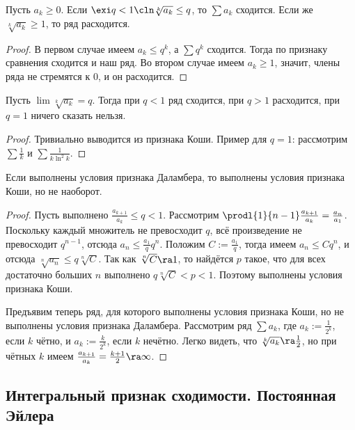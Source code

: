 \documentclass[a4paper]{article}
\begin{document}
\begin{theorem}
Пусть $a_k \ge 0$. Если $\exi q < 1\cln \sqrt[k]{a_k} \le q$, то $\sum a_k$ сходится.
Если же $\sqrt[k]{a_k} \ge 1$, то ряд расходится.
\end{theorem}
\begin{proof}
В первом случае имеем $a_k \le q^k$, а $\sum q^k$ сходится. Тогда по признаку сравнения сходится и наш ряд. Во
втором случае имеем $a_k \ge 1$, значит, члены ряда не стремятся к 0, и он расходится.
\end{proof}

\begin{theorem}
Пусть $\lim \sqrt[k]{a_k} = q$. Тогда при $q < 1$ ряд сходится, при $q > 1$ расходится, при $q=1$ ничего сказать нельзя.
\end{theorem}
\begin{proof}
Тривиально выводится из признака Коши. Пример для $q=1$: рассмотрим $\sum\frac{1}{k}$ и $\sum\frac{1}{k\ln^2 k}$.
\end{proof}

\begin{theorem}
Если выполнены условия признака Даламбера, то выполнены условия признака Коши, но не наоборот.
\end{theorem}
\begin{proof}
Пусть выполнено $\frac{a_{k+1}}{a_k} \le q < 1$.
Рассмотрим $\prodl{1}{n-1} \frac{a_{k+1}}{a_k} = \frac{a_n}{a_1}$. Поскольку каждый множитель не превосходит $q$, всё произведение не превосходит
$q^{n-1}$, отсюда $a_n \le \frac{a_1}{q}q^n$. Положим $C:=\frac{a_1}{q}$, тогда имеем $a_n \le Cq^n$, и
отсюда $\sqrt[n]{a_n} \le q \sqrt[n]{C}$. Так как $\sqrt[n]{C}\ra 1$, то найдётся $p$ такое, что для всех достаточно больших
$n$ выполнено $q \sqrt[n]{C} < p < 1$. Поэтому выполнены условия признака Коши.

Предъявим теперь ряд, для которого выполнены условия признака Коши, но не выполнены условия признака Даламбера. Рассмотрим ряд $\sum a_k$, где
$a_k:=\frac{1}{2^k}$, если $k$ чётно, и $a_k := \frac{k}{2^k}$, если $k$ нечётно. Легко видеть, что $\sqrt[k]{a_k} \ra \frac{1}{2}$, но
при чётных $k$ имеем $\frac{a_{k+1}}{a_k}=\frac{k+1}{2} \ra \infty$.
\end{proof}

\subsection{Интегральный признак сходимости. Постоянная Эйлера}
\end{document}

